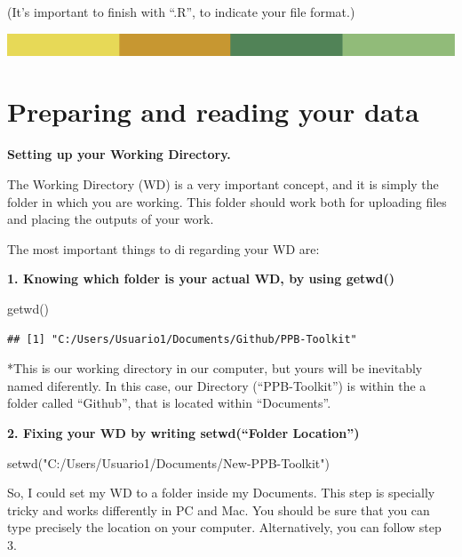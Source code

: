 \documentclass[
]{book}
\newenvironment{Shaded}{\begin{snugshade}}{\end{snugshade}}
\newcommand{\FunctionTok}[1]{\textcolor[rgb]{0.00,0.00,0.00}{#1}}
\newcommand{\NormalTok}[1]{#1}
\newcommand{\StringTok}[1]{\textcolor[rgb]{0.31,0.60,0.02}{#1}}
\begin{document}
(It's important to finish with ``.R'', to indicate your file format.)

\includegraphics{rsrstrip.png}

\hypertarget{preparing-and-reading-your-data}{%
\section{Preparing and reading your data}\label{preparing-and-reading-your-data}}

\textbf{Setting up your Working Directory. }

The Working Directory (WD) is a very important concept, and it is simply the folder in which you are working. This folder should work both for uploading files and placing the outputs of your work.

The most important things to di regarding your WD are:

\textbf{1. Knowing which folder is your actual WD, by using getwd() }

\begin{Shaded}
\begin{Highlighting}[]
\FunctionTok{getwd}\NormalTok{()  }
\end{Highlighting}
\end{Shaded}

\begin{verbatim}
## [1] "C:/Users/Usuario1/Documents/Github/PPB-Toolkit"
\end{verbatim}

*This is our working directory in our computer, but yours will be inevitably named diferently. In this case, our Directory (``PPB-Toolkit'') is within the a folder called ``Github'', that is located within ``Documents''.

\textbf{2. Fixing your WD by writing setwd(``Folder Location'') }

\begin{Shaded}
\begin{Highlighting}[]
\FunctionTok{setwd}\NormalTok{(}\StringTok{"C:/Users/Usuario1/Documents/New{-}PPB{-}Toolkit"}\NormalTok{)}
\end{Highlighting}
\end{Shaded}

So, I could set my WD to a folder inside my Documents. This step is specially tricky and works differently in PC and Mac. You should be sure that you can type precisely the location on your computer. Alternatively, you can follow step 3.
\end{document}
